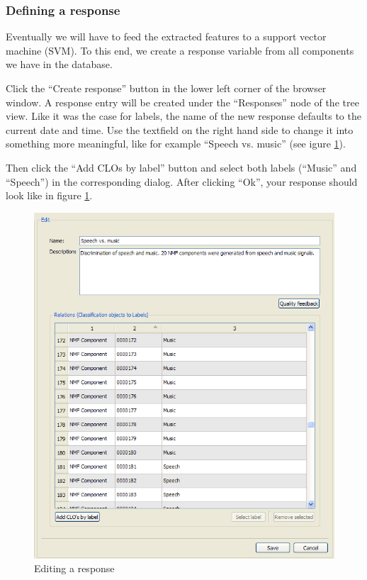 \subsubsection{Defining a response}

Eventually we will have to feed the extracted features to a support vector
machine (SVM). To this end, we create a response variable from all components we
have in the database.

Click the ``Create response'' button in the lower left corner of the browser
window. A response entry will be created under the ``Responses'' node of the
tree view. Like it was the case for labels, the name of the new response
defaults to the current date and time. Use the textfield on the right hand side
to change it into something more meaningful, like for example ``Speech
vs. music'' (see igure \ref{figure:TutorialEditResponse}).

Then click the ``Add CLOs by label'' button and select both labels (``Music''
and ``Speech'') in the corresponding dialog. After clicking ``Ok'', your
response should look like in figure \ref{figure:TutorialEditResponse}.

\begin{figure}
    \centering
    \includegraphics[width=\textwidth]{tutorial-media/EditResponse.png}
    \caption{%
        \label{figure:TutorialEditResponse}%
        Editing a response
    }
\end{figure}


